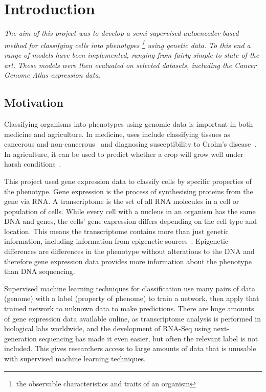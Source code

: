 \chapter{Introduction}

\textit{The aim of this project was to develop a semi-supervised autoencoder-based method for classifying 
cells into phenotypes \footnote{the observable characteristics and traits of an organism} using genetic data. To this end a range 
of models have been implemented, 
ranging from fairly simple to state-of-the-art. These models were then evaluated on selected datasets, including 
the Cancer Genome Atlas expression data.}

\section{Motivation}

Classifying organisms into phenotypes using genomic data is important in both medicine and agriculture. In medicine, uses include 
classifying tissues as cancerous and non-cancerous~\cite{Li2017} and diagnosing susceptibility to Crohn's disease~\cite{doi:10.1002/humu.23280}.
In agriculture, it can be used to predict whether a crop will grow well under harsh conditions~\cite{cimmyt}.

This project used gene expression data to classify cells by specific properties of the phenotype. Gene expression is the process of synthesising 
proteins from the gene via RNA. A transcriptome is the set of all RNA 
molecules in a cell or population of cells. While every cell with a nucleus in an organism has the same DNA and genes, the cells'
gene expression differs depending on the cell type and location. This means the
transcriptome contains more than just genetic information, including information from epigenetic sources~\cite{Gibney2010}. Epigenetic differences are differences
in the phenotype without alterations to the DNA and therefore gene expression data provides more information about 
the phenotype than DNA sequencing.

Supervised machine learning techniques for classification use many pairs of data (genome) with a label
(property of phenome) to train a network, then apply that trained network to unknown data to make predictions. 
There are huge amounts of gene expression data available online, as transcriptome analysis is performed in biological labs worldwide, 
and the development of RNA-Seq using next-generation sequencing has made it even easier, but often the relevant 
label is not included. This gives researchers access to large 
amounts of data that is unusable with supervised machine learning techniques.

